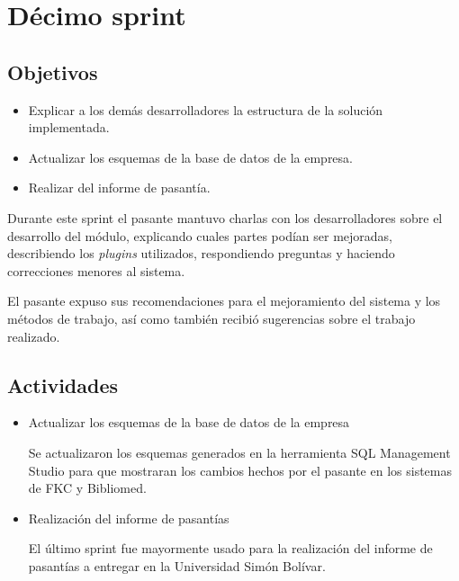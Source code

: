 \section{Décimo sprint} %
\label{sec:decimo_sprint}

\subsection{Objetivos}

\begin{itemize}
	\item Explicar a los demás desarrolladores la estructura de la solución implementada.
	\item Actualizar los esquemas de la base de datos de la empresa.
	\item Realizar del informe de pasantía.
\end{itemize}

Durante este sprint el pasante mantuvo charlas con los desarrolladores sobre el desarrollo del módulo, explicando cuales partes podían ser mejoradas, describiendo los \emph{plugins} utilizados, respondiendo preguntas y haciendo correcciones menores al sistema. 

El pasante expuso sus recomendaciones para el mejoramiento del sistema y los métodos de trabajo, así como también recibió sugerencias sobre el trabajo realizado.

\subsection{Actividades} %
\label{sub:actividades10}

\begin{itemize}

\item Actualizar los esquemas de la base de datos de la empresa

Se actualizaron los esquemas generados en la herramienta SQL Management Studio para que mostraran los cambios hechos por el pasante en los sistemas de FKC y Bibliomed.

\item Realización del informe de pasantías

El último sprint fue mayormente usado para la realización del informe de pasantías a entregar en la Universidad Simón Bolívar.

\end{itemize}



